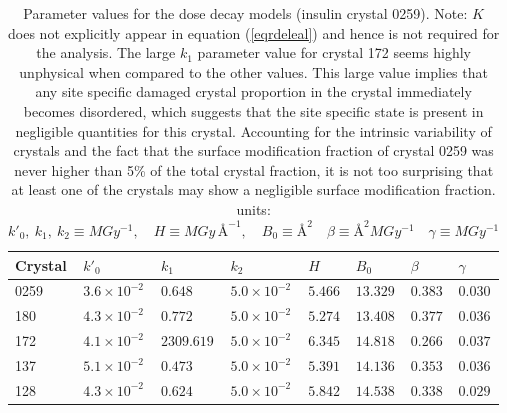 \begin{table}[H]
\small
\captionsetup{justification=centering}
	\caption{Parameter values for the dose decay models (insulin crystal 0259).
	Note: $K$ does not explicitly appear in equation (\ref{eqrdeleal}) and hence is not required for the analysis.
	The large $k_1$ parameter value for crystal 172 seems highly unphysical when compared to the other values.
	This large value implies that any site specific damaged crystal proportion in the crystal immediately becomes disordered, which suggests that the site specific state is present in negligible quantities for this crystal.
    Accounting for the intrinsic variability of crystals and the fact that the surface modification fraction of crystal 0259 was never higher than 5\% of the total crystal fraction, it is not too surprising that at least one of the crystals may show a negligible surface modification fraction.
	\newline
	units: $k'_0,\ k_1,\ k_2 \equiv MGy^{-1}, \quad H \equiv MGy\,\text{\AA}^{-1}, \quad B_0 \equiv \text{\AA}^2 \quad \beta \equiv \text{\AA}^2 MGy^{-1} \quad \gamma \equiv MGy^{-1}$}
	\centering
	\begin{tabular}{p{1.6cm} p{1.6cm} p{1.6cm} p{1.6cm} p{1.2cm} p{1.2cm} p{1.2cm} p{1.2cm}}
		\hline
		Crystal	&$k'_0$	& $k_1$	&$k_2$ &$H$	 &$B_0$	&$\beta$	&$\gamma$	\\
		\hline
		0259     &$3.6 \times 10^{-2}$   &$0.648$   	&$5.0 \times 10^{-2}$   &$5.466$    &$13.329$    &$0.383$  &$0.030$ \\
	  180      &$4.3 \times 10^{-2}$   &$0.772$   	&$5.0 \times 10^{-2}$   &$5.274$    &$13.408$    &$0.377$  &$0.036$ \\
		172      &$4.1 \times 10^{-2}$   &$2309.619$  &$5.0 \times 10^{-2}$   &$6.345$    &$14.818$    &$0.266$  &$0.037$ \\
	  137      &$5.1 \times 10^{-2}$   &$0.473$   	&$5.0 \times 10^{-2}$   &$5.391$    &$14.136$    &$0.353$  &$0.036$ \\
		128      &$4.3 \times 10^{-2}$   &$0.624$   	&$5.0 \times 10^{-2}$   &$5.842$    &$14.538$    &$0.338$  &$0.029$ \\
		\hline
	\end{tabular}
	\label{tab:RDE params1}
\end{table}

